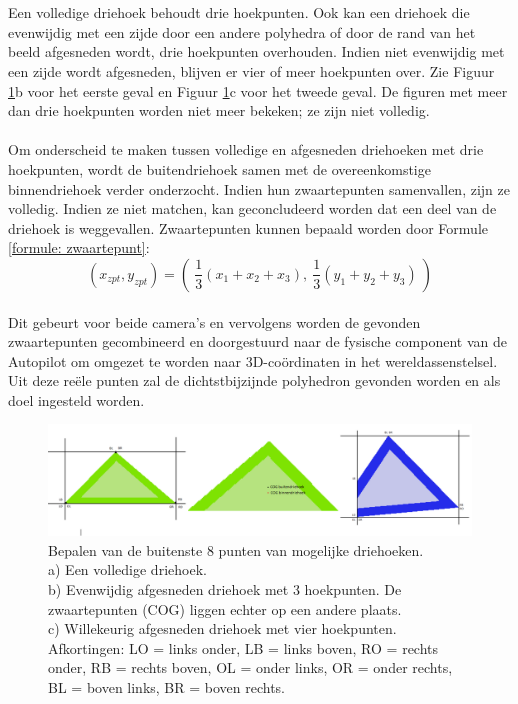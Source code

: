 \\\\
Een volledige driehoek behoudt drie hoekpunten. Ook kan een driehoek die evenwijdig met een zijde door een andere polyhedra of door de rand van het beeld afgesneden wordt, drie hoekpunten overhouden. Indien niet evenwijdig met een zijde wordt afgesneden, blijven er vier of meer hoekpunten over. Zie Figuur \ref{fig:DrieGevallenDriehoeken}b voor het eerste geval en Figuur \ref{fig:DrieGevallenDriehoeken}c voor het tweede geval. De figuren met meer dan drie hoekpunten worden niet meer bekeken; ze zijn niet volledig.
\\\\
Om onderscheid te maken tussen volledige en afgesneden driehoeken met drie hoekpunten, wordt de buitendriehoek samen met de overeenkomstige binnendriehoek verder onderzocht. Indien hun zwaartepunten samenvallen, zijn ze volledig. Indien ze niet matchen, kan geconcludeerd worden dat een deel van de driehoek is weggevallen. Zwaartepunten kunnen bepaald worden door Formule \ref{formule: zwaartepunt}: \begin{equation}
\label{formule: zwaartepunt}
(x_{zpt},y_{zpt}) = ( \ \frac{1}{3}(x_1 + x_2 + x_3) , \ \frac{1}{3}(y_1 + y_2 + y_3) \ )
\end{equation}
\\
Dit gebeurt voor beide camera's en vervolgens worden de gevonden zwaartepunten gecombineerd en doorgestuurd naar de fysische component van de Autopilot om omgezet te worden naar 3D-co\"ordinaten in het wereldassenstelsel. Uit deze re\"ele punten zal de dichtstbijzijnde polyhedron gevonden worden en als doel ingesteld worden.
\\
\begin{figure}[h]
	\centering
	\includegraphics[width=1\textwidth]{BeeldverwerkingDriehoeken.png}
	\caption{Bepalen van de buitenste 8 punten van mogelijke driehoeken. \\ a) Een volledige driehoek. \\ b) Evenwijdig afgesneden driehoek met 3 hoekpunten. De zwaartepunten (COG) liggen echter op een andere plaats. \\ c) Willekeurig afgesneden driehoek met vier hoekpunten. \\ 
	Afkortingen: LO = links onder, LB = links boven, RO = rechts onder, RB = rechts boven, OL = onder links, OR = onder rechts, BL = boven links, BR = boven rechts.}
	\label{fig:DrieGevallenDriehoeken}
\end{figure}

